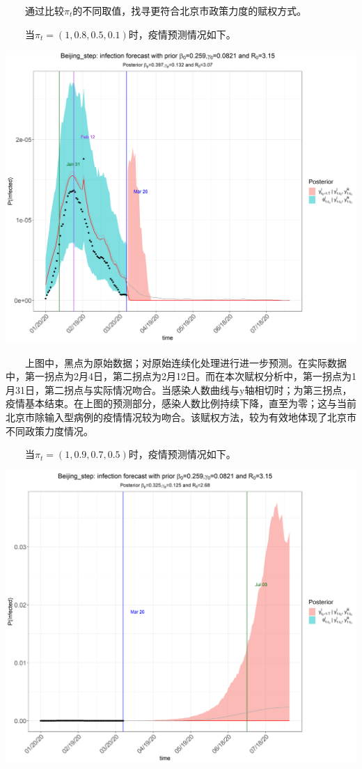 \documentclass[12pt,a5paper,]{article}
\begin{document}
  通过比较\(\pi_{t}\)的不同取值，找寻更符合北京市政策力度的赋权方式。

  当\(\pi_{t}=(1,0.8,0.5,0.1)\)时，疫情预测情况如下。

\includegraphics[width=50in]{figures/infection1}

  上图中，黑点为原始数据；对原始连续化处理进行进一步预测。在实际数据中，第一拐点为2月4日，第二拐点为2月12日。而在本次赋权分析中，第一拐点为1月31日，第二拐点与实际情况吻合。当感染人数曲线与y轴相切时；为第三拐点，疫情基本结束。在上图的预测部分，感染人数比例持续下降，直至为零；这与当前北京市除输入型病例的疫情情况较为吻合。该赋权方法，较为有效地体现了北京市不同政策力度情况。

  当\(\pi_{t}=(1,0.9,0.7,0.5)\)时，疫情预测情况如下。

\includegraphics[width=50in]{figures/infection2}
\end{document}
